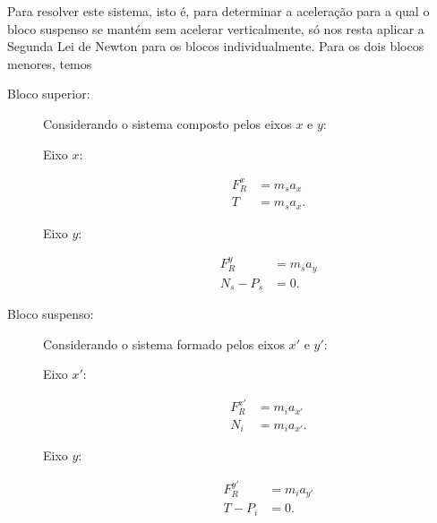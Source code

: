 Para resolver este sistema, isto é, para determinar a aceleração para a qual o bloco suspenso se mantém sem acelerar verticalmente, só nos resta aplicar a Segunda Lei de Newton para os blocos individualmente. Para os dois blocos menores, temos
\begin{description}
    \item[Bloco superior:] Considerando o sistema composto pelos eixos $x$ e $y$:
        \begin{description}
            \item[Eixo $x$:]
                \begin{align}
                    F_R^x &= m_s a_x \\
                    T &= m_s a_x.
                \end{align}
            \item[Eixo $y$:]
                \begin{align}
                    F_R^y &= m_s a_y \\
                    N_s - P_s &= 0.
                \end{align}
        \end{description}
    \item[Bloco suspenso:] Considerando o sistema formado pelos eixos $x'$ e $y'$:
        \begin{description}
            \item[Eixo $x'$:]
                \begin{align}
                    F_R^{x'} &= m_i a_{x'} \\
                    N_i &= m_i a_{x'}.
                \end{align}
            \item[Eixo $y$:]
                \begin{align}
                    F_R^{y'} &= m_i a_{y'} \\
                    T - P_i &= 0.
                \end{align}
        \end{description}
\end{description}

